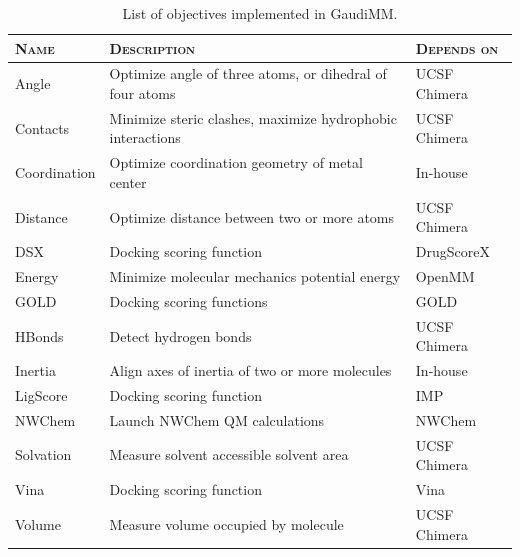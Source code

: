 \begin{table}[hbtp]
	\caption[List of objectives implemented in GaudiMM]{List of objectives implemented in GaudiMM.}
	\label{table:gaudi-objectives}
\footnotesize
{}%
%
%
\begin{tabularx}{\textwidth}{LMR}
\toprule
\textsc{Name} & \textsc{Description} & \textsc{Depends on} \\
\toprule
 Angle & Optimize angle of three atoms, or dihedral of four atoms & UCSF Chimera \\
\hhline{~~~}
 Contacts & Minimize steric clashes, maximize hydrophobic interactions & UCSF Chimera \\
\hhline{~~~}
 Coordination & Optimize coordination geometry of metal center & In-house\cite{gaudimetals} \\
\hhline{~~~}
 Distance & Optimize distance between two or more atoms & UCSF Chimera \\
\hhline{~~~}
 DSX & Docking scoring function  & DrugScoreX\cite{neudert2011dsx} \\
\hhline{~~~}
 Energy & Minimize molecular mechanics potential energy & OpenMM\cite{openmm} \\
\hhline{~~~}
 GOLD & Docking scoring functions & GOLD\cite{gold} \\
\hhline{~~~}
 HBonds & Detect hydrogen bonds  & UCSF Chimera \\
\hhline{~~~}
 Inertia & Align axes of inertia of two or more molecules & In-house \\
\hhline{~~~}
 LigScore & Docking scoring function & IMP\cite{krammer2005ligscore} \\
\hhline{~~~}
 NWChem & Launch NWChem QM calculations & NWChem\cite{nwchem} \\
\hhline{~~~}
 Solvation & Measure solvent accessible solvent area & UCSF Chimera \\
\hhline{~~~}
 Vina & Docking scoring function & Vina\cite{trott2010autodock} \\
\hhline{~~~}
 Volume & Measure volume occupied by molecule & UCSF Chimera \\
\bottomrule

\end{tabularx}
 \end{table}



